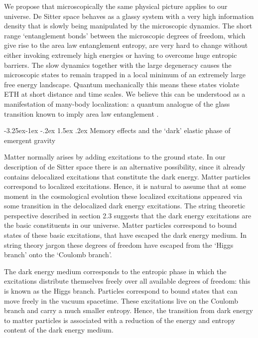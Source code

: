 \documentclass[a4paper,12pt]{article}
\makeatletter
\renewcommand\subsection{\@startsection{subsection}{2}{\z@}%
                                     {-3.25ex\@plus -1ex \@minus -.2ex}%
                                     {1.5ex \@plus .2ex}%
                                     {\normalfont\bfseries}}
\makeatother
\begin{document}
We propose that microscopically the same physical picture applies to our universe. De Sitter space behaves as a glassy system with a very high information density that is 
slowly being manipulated by the microscopic dynamics.  
The short range `entanglement bonds' between the microscopic degrees of freedom, which give rise to the area law entanglement entropy,  are very hard to change 
without either invoking extremely high energies or
having to overcome huge entropic barriers. %
The slow dynamics together with the large degeneracy causes the 
microscopic states to remain trapped in a local minimum of an extremely large free energy landscape. %
Quantum mechanically this means these states violate ETH at short distance and time scales. We believe this can be understood as a manifestation of many-body localization: a quantum analogue of the glass transition known to imply area law entanglement \cite{Huse1, Grover}.  

\subsection{Memory effects and the `dark' elastic phase of emergent gravity}

Matter normally arises by adding excitations to the ground state. In our description of de Sitter space there is an alternative possibility, since it already contains delocalized excitations that constitute the dark energy. Matter particles correspond to localized excitations. Hence, it is natural to assume that at some moment in the cosmological evolution these localized excitations  appeared via some transition in the delocalized dark energy excitations. The string theoretic perspective described in section 2.3 suggests that the dark energy excitations are the basic constituents in our universe. Matter particles correspond to bound states of these basic excitations, that have escaped the dark energy medium.  In string theory jargon these degrees of freedom have escaped from the `Higgs branch' onto the `Coulomb branch'.  

The dark energy medium corresponds to the entropic phase in which the excitations distribute themselves freely over all available degrees of freedom: this is known as the Higgs branch.  Particles correspond to bound states that can move freely in the vacuum spacetime. These excitations live on the Coulomb branch and carry a much smaller entropy.  Hence, the transition from dark energy to matter particles is associated with a reduction of the energy and entropy content of the dark energy medium. 
\end{document}
